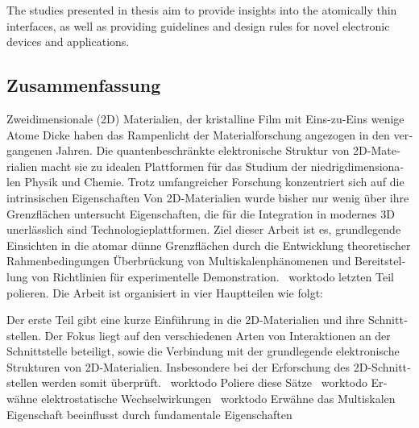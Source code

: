 The studies presented in thesis aim to provide insights into the
atomically thin interfaces, as well as providing guidelines and design rules for novel electronic devices and applications.


\endgroup

\cleardoublepage%

\begingroup
\let\clearpage\relax
\let\cleardoublepage\relax
\let\cleardoublepage\relax

\begin{otherlanguage}{ngerman}
\chapter*{Zusammenfassung}

Zweidimensionale (2D) Materialien, der kristalline Film mit Eins-zu-Eins
wenige Atome Dicke haben das Rampenlicht der Materialforschung angezogen
in den vergangenen Jahren.
%
Die quantenbeschränkte elektronische Struktur von 2D-Materialien macht sie zu idealen Plattformen für das Studium der niedrigdimensionalen Physik und Chemie.
%
Trotz umfangreicher Forschung konzentriert sich auf die intrinsischen Eigenschaften
Von 2D-Materialien wurde bisher nur wenig über ihre Grenzflächen untersucht
Eigenschaften, die für die Integration in modernes 3D unerlässlich sind
Technologieplattformen.
%
Ziel dieser Arbeit ist es, grundlegende Einsichten in die
atomar dünne Grenzflächen durch die Entwicklung theoretischer Rahmenbedingungen
Überbrückung von Multiskalenphänomenen und Bereitstellung von Richtlinien für experimentelle
Demonstration. \ worktodo {letzten Teil polieren}. Die Arbeit ist organisiert
in vier Hauptteilen wie folgt:

Der erste Teil gibt eine kurze Einführung in die 2D-Materialien und
ihre Schnittstellen.
%
Der Fokus liegt auf den verschiedenen Arten von Interaktionen
an der Schnittstelle beteiligt, sowie die Verbindung mit der
grundlegende elektronische Strukturen von 2D-Materialien.
%
Insbesondere bei der Erforschung des
2D-Schnittstellen werden somit überprüft. \ worktodo {Poliere diese Sätze} \ worktodo {Erwähne
elektrostatische Wechselwirkungen} \ worktodo {Erwähne das Multiskalen
Eigenschaft beeinflusst durch fundamentale Eigenschaften}



\end{otherlanguage}
